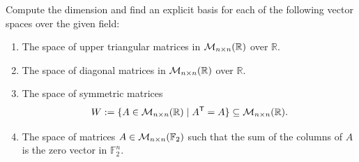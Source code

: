 \begin{exercise}
\label{exc:matrix_subspaces_dimension_bases}
Compute the dimension and find an explicit basis for each of the following vector spaces over the given field:
\begin{enumerate}
    \item The space of upper triangular matrices in $\mathcal{M}_{n \times n}(\mathbb{R})$ over $\mathbb{R}$.
    \item The space of diagonal matrices in $\mathcal{M}_{n \times n}(\mathbb{R})$ over $\mathbb{R}$.
    \item The space of symmetric matrices
    \[
    W := \{A \in \mathcal{M}_{n \times n}(\mathbb{R}) \mid A^{\mathsf{T}} = A\} \subseteq \mathcal{M}_{n \times n}(\mathbb{R}).
    \]
    \item The space of matrices $A \in \mathcal{M}_{n \times n}(\mathbb{F}_2)$ such that the sum of the columns of $A$ is the zero vector in $\mathbb{F}_2^n$.
\end{enumerate}
\end{exercise}

